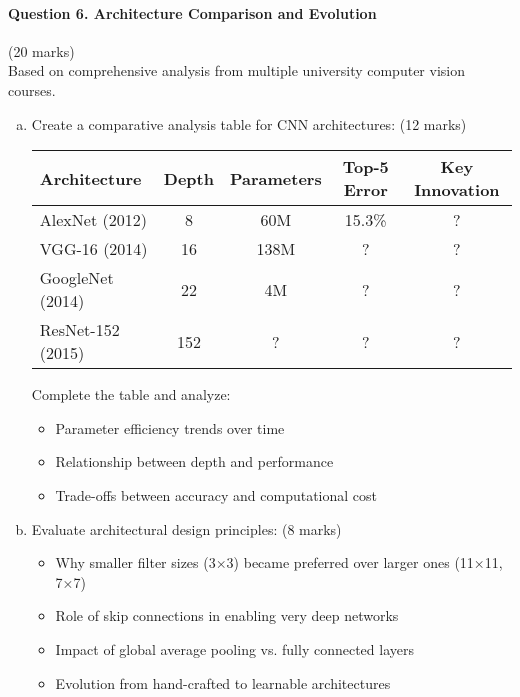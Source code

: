 \documentclass[12pt]{article}
\newcommand{\shortanswer}{\vspace{2cm}}
\newcommand{\mediumanswer}{\vspace{3cm}}
\begin{document}
\newpage
\paragraph{Question 6. Architecture Comparison and Evolution}{\hfill (20 marks)}\\
Based on comprehensive analysis from multiple university computer vision courses.

\begin{enumerate}[(a)]
    \item Create a comparative analysis table for CNN architectures: \hfill (12 marks)
    
    \begin{center}
    \begin{tabular}{|l|c|c|c|c|}
    \hline
    Architecture & Depth & Parameters & Top-5 Error & Key Innovation \\
    \hline
    AlexNet (2012) & 8 & 60M & 15.3\% & ? \\
    VGG-16 (2014) & 16 & 138M & ? & ? \\
    GoogleNet (2014) & 22 & 4M & ? & ? \\
    ResNet-152 (2015) & 152 & ? & ? & ? \\
    \hline
    \end{tabular}
    \end{center}
    
    Complete the table and analyze:
    \begin{itemize}
        \item Parameter efficiency trends over time
        \item Relationship between depth and performance
        \item Trade-offs between accuracy and computational cost
    \end{itemize}
    
    \mediumanswer
    
    \item Evaluate architectural design principles: \hfill (8 marks)
    \begin{itemize}
        \item Why smaller filter sizes (3×3) became preferred over larger ones (11×11, 7×7)
        \item Role of skip connections in enabling very deep networks
        \item Impact of global average pooling vs. fully connected layers
        \item Evolution from hand-crafted to learnable architectures
    \end{itemize}
    
    \shortanswer
\end{enumerate}
\end{document}
